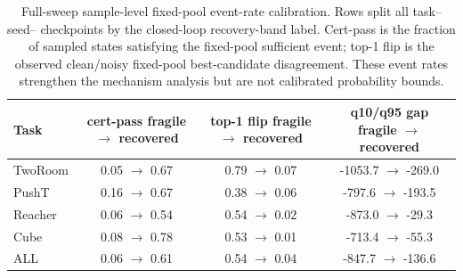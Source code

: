 \begin{table}[H]
\centering
\caption{Full-sweep sample-level fixed-pool event-rate calibration. Rows split all task--seed--\stdmax{} checkpoints by the closed-loop recovery-band label. Cert-pass is the fraction of sampled states satisfying the fixed-pool sufficient event; top-1 flip is the observed clean/noisy fixed-pool best-candidate disagreement. These event rates strengthen the mechanism analysis but are not calibrated probability bounds.}
\label{tab:sample-level-certificate-full-sweep}
\small
\setlength{\tabcolsep}{4pt}
\begin{tabular}{lccc}
\toprule
Task & cert-pass fragile $\to$ recovered & top-1 flip fragile $\to$ recovered & q10/q95 gap fragile $\to$ recovered \\
\midrule
TwoRoom & 0.05 $\to$ 0.67 & 0.79 $\to$ 0.07 & -1053.7 $\to$ -269.0 \\
PushT & 0.16 $\to$ 0.67 & 0.38 $\to$ 0.06 & -797.6 $\to$ -193.5 \\
Reacher & 0.06 $\to$ 0.54 & 0.54 $\to$ 0.02 & -873.0 $\to$ -29.3 \\
Cube & 0.08 $\to$ 0.78 & 0.53 $\to$ 0.01 & -713.4 $\to$ -55.3 \\
ALL & 0.06 $\to$ 0.61 & 0.54 $\to$ 0.04 & -847.7 $\to$ -136.6 \\
\bottomrule
\end{tabular}
\end{table}

